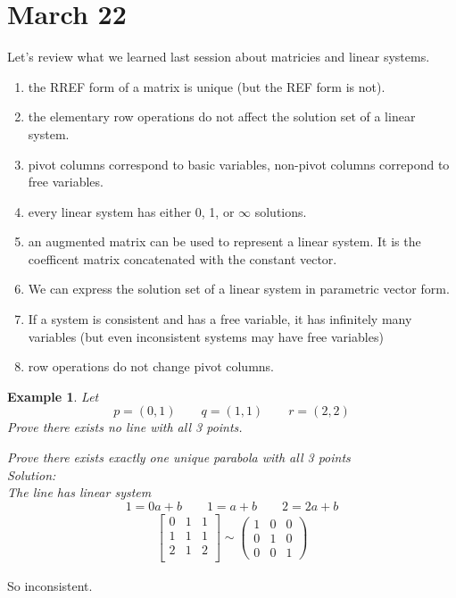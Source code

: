 \documentclass[11pt]{article}
\newtheorem{ex}{Example}
\begin{document}
\section{March 22}
Let's review what we learned last session about matricies and linear systems.
\begin{enumerate}
  \item the RREF form of a matrix is unique (but the REF form is not).
  \item the elementary row operations do not affect the solution set of a linear system.
  \item pivot columns correspond to basic variables, non-pivot columns correpond to free variables.
  \item every linear system has either 0, 1, or $\infty$ solutions.
  \item an augmented matrix can be used to represent a linear system. It is the coefficent matrix concatenated with the constant vector.
  \item We can express the solution set of a linear system in parametric vector form.
  \item If a system is consistent and has a free variable, it has infinitely many variables (but even inconsistent systems may have free variables)
  \item row operations do not change pivot columns.
\end{enumerate}

\begin{ex}
  Let
  \[p = (0,1) \qquad q = (1,1) \qquad r = (2,2)\]
  Prove there exists no line with all 3 points.

  Prove there exists exactly one unique parabola with all 3 points
  \\
  Solution: \\

  The line has linear system
  \[1  = 0a + b \qquad 1 = a + b \qquad 2 = 2a + b\]
  \begin{align*}
    \begin{bmatrix}
      0 & 1 & 1 \\
      1 & 1 & 1 \\
      2 & 1 & 2 \\
    \end{bmatrix}
    \sim
\left(\begin{array}{rrr}
1 & 0 & 0 \\
0 & 1 & 0 \\
0 & 0 & 1
\end{array}\right)
    \end{align*}
\end{ex}
So inconsistent.
\end{document}
